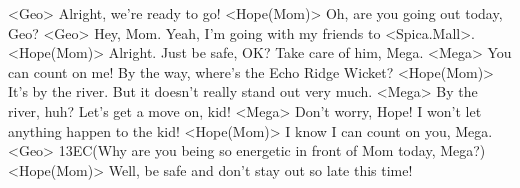 <Geo> Alright, we're ready to go! 
<Hope(Mom)> Oh, are you going out today, Geo? 
<Geo> Hey, Mom. 
Yeah, I'm going with my friends to <Spica.Mall>. 
<Hope(Mom)> Alright. Just be safe, OK? 
Take care of him, Mega. 
<Mega> You can count on me! 
By the way, where's the Echo Ridge Wicket? 
<Hope(Mom)> It's by the river. 
But it doesn't really stand out very much. 
<Mega> By the river, huh? Let's get a move on, kid! 
<Mega> Don't worry, Hope! 
I won't let anything happen to the kid! 
<Hope(Mom)> I know I can count on you, Mega. 
<Geo> {13}{EC}(Why are you being so  energetic in front of  Mom today, Mega?) 
<Hope(Mom)> Well, be safe and don't stay out so late this time! 
